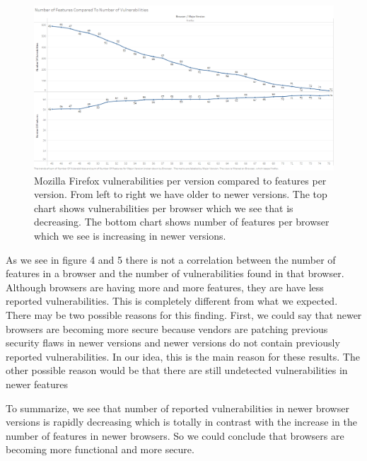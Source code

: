 \begin{figure}[ht]
    \centering
    \includegraphics[width=\columnwidth]{figures/Firefox-feature-vulnerability.png}
    \caption{Mozilla Firefox vulnerabilities per version compared to features per version. From left to right we have older to newer versions. The top chart shows vulnerabilities per browser which we see that is decreasing. The bottom chart shows number of features per browser which we see is increasing in newer versions.}
    \label{fig:firefox-vuln}
\end{figure}

As we see in figure 4 and 5 there is not a correlation between the number of features in a browser and the number of vulnerabilities found in that browser. Although browsers are having more and more features, they are have less reported vulnerabilities. This is completely different from what we expected. There may be two possible reasons for this finding. First, we could say that newer browsers are becoming more secure because vendors are patching previous security flaws in newer versions and newer versions do not contain previously reported vulnerabilities. In our idea, this is the main reason for these results. The other possible reason would be that there are still undetected vulnerabilities in newer features 

To summarize, we see that number of reported vulnerabilities in newer browser versions is rapidly decreasing which is totally in contrast with the increase in the number of features in newer browsers. So we could conclude that browsers are becoming more functional and more secure.